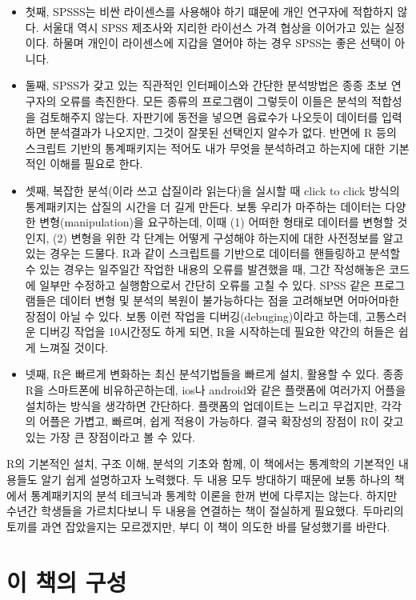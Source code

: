 \documentclass[
]{book}
\theoremstyle{definition}
\theoremstyle{definition}
\theoremstyle{definition}
\theoremstyle{definition}
\theoremstyle{remark}
\begin{document}
\begin{itemize}
\item
  첫째, SPSSS는 비싼 라이센스를 사용해야 하기 떄문에 개인 연구자에 적합하지 않다. 서울대 역시 SPSS 제조사와 지리한 라이선스 가격 협상을 이어가고 있는 실정이다. 하물며 개인이 라이센스에 지갑을 열어야 하는 경우 SPSS는 좋은 선택이 아니다.
\item
  둘째, SPSS가 갖고 있는 직관적인 인터페이스와 간단한 분석방법은 종종 초보 연구자의 오류를 촉진한다. 모든 종류의 프로그램이 그렇듯이 이들은 분석의 적합성을 검토해주지 않는다. 자판기에 동전을 넣으면 음료수가 나오듯이 데이터를 입력하면 분석결과가 나오지만, 그것이 잘못된 선택인지 알수가 없다. 반면에 R 등의 스크립트 기반의 통계패키지는 적어도 내가 무엇을 분석하려고 하는지에 대한 기본적인 이해를 필요로 한다.
\item
  셋째, 복잡한 분석(이라 쓰고 삽질이라 읽는다)을 실시할 때 click to click 방식의 통계패키지는 삽질의 시간을 더 길게 만든다. 보통 우리가 마주하는 데이터는 다양한 변형(manipulation)을 요구하는데, 이때 (1) 어떠한 형태로 데이터를 변형할 것인지, (2) 변형을 위한 각 단계는 어떻게 구성해야 하는지에 대한 사전정보를 알고 있는 경우는 드물다. R과 같이 스크립트를 기반으로 데이터를 핸들링하고 분석할 수 있는 경우는 일주일간 작업한 내용의 오류를 발견했을 때, 그간 작성해놓은 코드에 일부만 수정하고 실행함으로서 간단히 오류를 고칠 수 있다. SPSS 같은 프로그램들은 데이터 변형 및 분석의 복원이 불가능하다는 점을 고려해보면 어마어마한 장점이 아닐 수 있다. 보통 이런 작업을 디버깅(debuging)이라고 하는데, 고통스러운 디버깅 작업을 10시간정도 하게 되면, R을 시작하는데 필요한 약간의 허들은 쉽게 느껴질 것이다.
\item
  넷째, R은 빠르게 변화하는 최신 분석기법들을 빠르게 설치, 활용할 수 있다. 종종 R을 스마트폰에 비유하곤하는데, ios나 android와 같은 플랫폼에 여러가지 어플을 설치하는 방식을 생각하면 간단하다. 플랫폼의 업데이트는 느리고 무겁지만, 각각의 어플은 가볍고, 빠르며, 쉽게 적용이 가능하다. 결국 확장성의 장점이 R이 갖고 있는 가장 큰 장점이라고 볼 수 있다.
\end{itemize}

R의 기본적인 설치, 구조 이해, 분석의 기초와 함께, 이 책에서는 통계학의 기본적인 내용들도 알기 쉽게 설명하고자 노력했다. 두 내용 모두 방대하기 때문에 보통 하나의 책에서 통계패키지의 분석 테크닉과 통계학 이론을 한꺼 번에 다루지는 않는다. 하지만 수년간 학생들을 가르치다보니 두 내용을 연결하는 책이 절실하게 필요했다. 두마리의 토끼를 과연 잡았을지는 모르겠지만, 부디 이 책이 의도한 바를 달성했기를 바란다.

\hypertarget{uxc774-uxcc45uxc758-uxad6cuxc131}{%
\section{이 책의 구성}\label{uxc774-uxcc45uxc758-uxad6cuxc131}}
\end{document}

